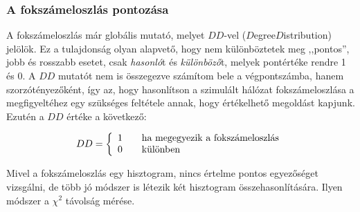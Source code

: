 
    \subsubsection{A fokszámeloszlás pontozása}
    A fokszámeloszlás már globális mutató, melyet $DD$-vel ($D$egree$D$istribution) jelölök. Ez a tulajdonság olyan alapvető, hogy nem különböztetek meg ,,pontos'', jobb és rosszabb esetet, csak \textit{hasonló}t és \textit{különböző}t, melyek pontértéke rendre 1 és 0. A $DD$ mutatót nem is összegezve számítom bele a végpontszámba, hanem szorzótényezőként, így az, hogy hasonlítson a szimulált hálózat fokszámeloszlása a megfigyeltéhez egy szükséges feltétele annak, hogy értékelhető megoldást kapjunk. Ezutén a $DD$ értéke a következő:

    $$ DD = \left\{
    \begin{array}{l l}
      1 & \quad \text{ha megegyezik a fokszámeloszlás}\\
      0 & \quad \text{különben}
    \end{array} \right.$$

    Mivel a fokszámeloszlás egy hisztogram, nincs értelme pontos egyezőséget vizsgálni, de több jó módszer is létezik két hisztogram összehasonlítására. Ilyen módszer a $\chi^2$ távolság mérése.


